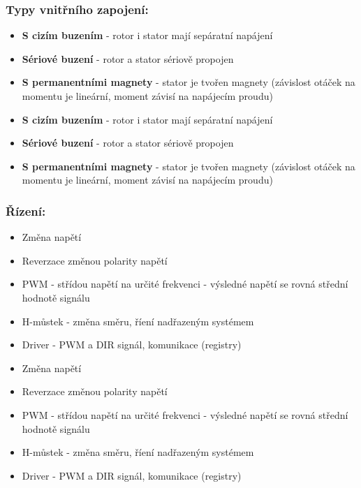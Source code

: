 \subsubsection*{Typy vnitřního zapojení:}
\begin{itemize}
  \item \textbf{S cizím buzením} - rotor i stator mají sepáratní napájení
  \item \textbf{Sériové buzení} - rotor a stator sériově propojen
  \item \textbf{S permanentními magnety} - stator je tvořen magnety (závislost otáček na momentu je lineární, moment závisí na napájecím proudu)
    \item \textbf{S cizím buzením} - rotor i stator mají sepáratní napájení
    \item \textbf{Sériové buzení} - rotor a stator sériově propojen
    \item \textbf{S permanentními magnety} - stator je tvořen magnety (závislost otáček na momentu je lineární, moment závisí na napájecím proudu)
\end{itemize}

\subsubsection*{Řízení:}
\begin{itemize}
  \item Změna napětí
  \item Reverzace změnou polarity napětí
  \item PWM - střídou napětí na určité frekvenci - výsledné napětí se rovná střední hodnotě signálu
  \item H-můstek - změna směru, říení nadřazeným systémem
  \item Driver - PWM a DIR signál, komunikace (registry)
    \item Změna napětí
    \item Reverzace změnou polarity napětí
    \item PWM - střídou napětí na určité frekvenci - výsledné napětí se rovná střední hodnotě signálu
    \item H-můstek - změna směru, říení nadřazeným systémem
    \item Driver - PWM a DIR signál, komunikace (registry)
\end{itemize}

